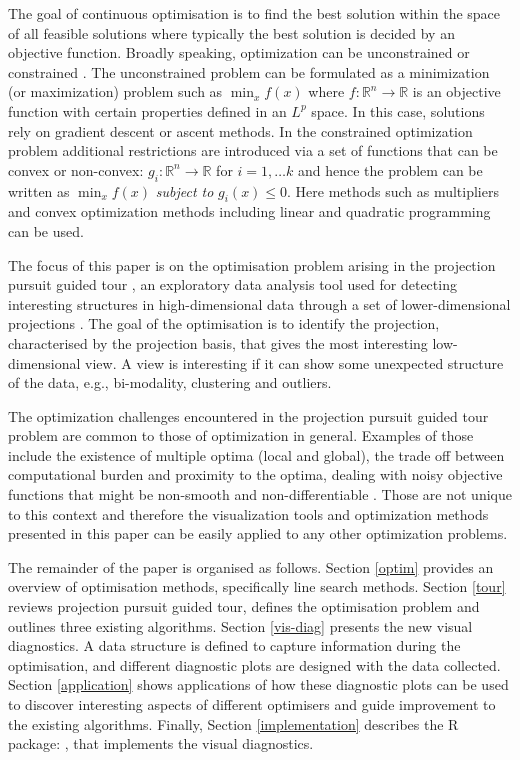 The goal of continuous optimisation is to find the best solution within
the space of all feasible solutions where typically the best solution is
decided by an objective function. Broadly speaking, optimization can be
unconstrained or constrained \citep{kelley1999iterative}. The
unconstrained problem can be formulated as a minimization (or
maximization) problem such as \(\min_{x} f(x)\) where
\(f:\mathbb{R}^n \rightarrow \mathbb{R}\) is an objective function with
certain properties defined in an \(L^p\) space. In this case, solutions
rely on gradient descent or ascent methods. In the constrained
optimization problem additional restrictions are introduced via a set of
functions that can be convex or non-convex:
\(g_i:\mathbb{R}^n \rightarrow \mathbb{R}\) for \(i = 1, \ldots k\) and
hence the problem can be written as \(\min_{x} f(x)\) \emph{subject to}
\(g_i(x) \leq 0\). Here methods such as multipliers and convex
optimization methods including linear and quadratic programming can be
used.

The focus of this paper is on the optimisation problem arising in the
projection pursuit guided tour \citep{buja2005computational}, an
exploratory data analysis tool used for detecting interesting structures
in high-dimensional data through a set of lower-dimensional projections
\citep{cook2008grand}. The goal of the optimisation is to identify the
projection, characterised by the projection basis, that gives the most
interesting low-dimensional view. A view is interesting if it can show
some unexpected structure of the data, e.g., bi-modality, clustering and
outliers.

The optimization challenges encountered in the projection pursuit guided
tour problem are common to those of optimization in general. Examples of
those include the existence of multiple optima (local and global), the
trade off between computational burden and proximity to the optima,
dealing with noisy objective functions that might be non-smooth and
non-differentiable \citep{jones1998efficient}. Those are not unique to
this context and therefore the visualization tools and optimization
methods presented in this paper can be easily applied to any other
optimization problems.

The remainder of the paper is organised as follows. Section \ref{optim}
provides an overview of optimisation methods, specifically line search
methods. Section \ref{tour} reviews projection pursuit guided tour,
defines the optimisation problem and outlines three existing algorithms.
Section \ref{vis-diag} presents the new visual diagnostics. A data
structure is defined to capture information during the optimisation, and
different diagnostic plots are designed with the data collected. Section
\ref{application} shows applications of how these diagnostic plots can
be used to discover interesting aspects of different optimisers and
guide improvement to the existing algorithms. Finally, Section
\ref{implementation} describes the R package: , that
implements the visual diagnostics.

